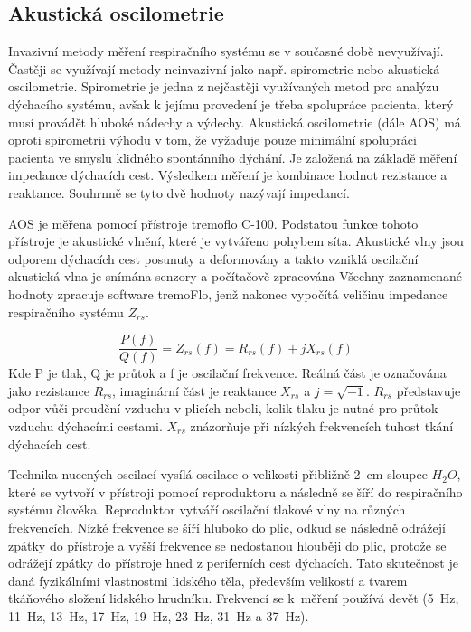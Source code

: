 \label{kap-metody}

\subsection {Akustická oscilometrie}
Invazivní metody měření respiračního systému se v současné době nevyužívají. Častěji se využívají metody neinvazivní jako např. spirometrie nebo akustická oscilometrie. Spirometrie je jedna z nejčastěji využívaných metod pro analýzu dýchacího systému, avšak k jejímu provedení je třeba spolupráce pacienta, který musí provádět hluboké nádechy a výdechy.
Akustická oscilometrie (dále AOS) má oproti spirometrii výhodu v tom, že vyžaduje pouze minimální spolupráci pacienta ve smyslu klidného spontánního dýchání. 
Je založená na základě měření impedance dýchacích cest. Výsledkem měření je kombinace hodnot rezistance a reaktance. Souhrnně se tyto dvě hodnoty nazývají impedancí. 

AOS je měřena pomocí přístroje tremoflo C-100. Podstatou funkce tohoto přístroje je akustické vlnění, které je vytvářeno pohybem síta. Akustické vlny jsou odporem dýchacích cest posunuty a deformovány a takto vzniklá oscilační akustická vlna je snímána senzory a počítačově zpracována
 Všechny zaznamenané hodnoty zpracuje software tremoFlo, jenž nakonec vypočítá veličinu impedance respiračního systému $Z_{rs}$. 

\begin{equation}
 \label{rce:1}
  \frac{P(f)}{Q(f)} = Z_{rs}(f) = R_{rs}(f) + j X_{rs}(f) 
\end{equation}
Kde P je tlak, Q je průtok a f je oscilační frekvence. 
Reálná část je označována jako rezistance $R_{rs}$, imaginární část je reaktance $X_{rs}$ a $j = \sqrt{-1}$. 
$R_{rs}$ představuje odpor vůči proudění vzduchu v plicích neboli, kolik tlaku je nutné pro průtok vzduchu dýchacími cestami. $X_{rs}$ znázorňuje při nízkých frekvencích tuhost tkání dýchacích cest.  \cite{Vlcek2018}


Technika nucených oscilací vysílá oscilace o velikosti přibližně \SI{2}{cm} sloupce $H_{2}O$, které se vytvoří v přístroji pomocí reproduktoru a následně se šíří do respiračního systému člověka. Reproduktor vytváří oscilační tlakové vlny na různých frekvencích. Nízké frekvence se šíří hluboko do plic, odkud se následně odrážejí zpátky do přístroje a vyšší frekvence se nedostanou hlouběji do plic, protože se  odrážejí zpátky do přístroje hned z periferních cest dýchacích. Tato skutečnost je daná fyzikálními vlastnostmi lidského těla, především velikostí a tvarem tkáňového složení lidského hrudníku. \cite{Vlcek2018} Frekvencí se k~měření používá devět (\SI{5}{Hz}, \SI{11}{Hz}, \SI{13}{Hz}, \SI{17}{Hz}, \SI{19}{Hz}, \SI{23}{Hz}, \SI{31}{Hz} a  \SI{37}{Hz}). 


